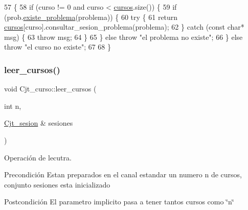 \begin{DoxyCode}
57                                                                                           \{
58   \textcolor{keywordflow}{if} (curso != 0 and curso < \mbox{\hyperlink{class_cjt__curso_af8d4def315cf56b9aab3328bf80bb32c}{cursos}}.size()) \{
59     \textcolor{keywordflow}{if} (prob.\mbox{\hyperlink{class_cjt__problema_a831be5b51e252520ee981b58d9ec00e9}{existe\_problema}}(problema)) \{
60       \textcolor{keywordflow}{try} \{
61        \textcolor{keywordflow}{return} \mbox{\hyperlink{class_cjt__curso_af8d4def315cf56b9aab3328bf80bb32c}{cursos}}[curso].consultar\_sesion\_problema(problema);
62      \} \textcolor{keywordflow}{catch} (\textcolor{keyword}{const} \textcolor{keywordtype}{char}* msg) \{
63          \textcolor{keywordflow}{throw} msg;
64      \}
65    \} \textcolor{keywordflow}{else} \textcolor{keywordflow}{throw} \textcolor{stringliteral}{"el problema no existe"};
66   \} \textcolor{keywordflow}{else} \textcolor{keywordflow}{throw} \textcolor{stringliteral}{"el curso no existe"};
67 
68 \}
\end{DoxyCode}
\mbox{\label{class_cjt__curso_a16e2b8c5304b5cb0562f95089f020a97}} 
\subsubsection{\texorpdfstring{leer\+\_\+cursos()}{leer\_cursos()}}
{\footnotesize\ttfamily void Cjt\+\_\+curso\+::leer\+\_\+cursos (\begin{DoxyParamCaption}\item[{int}]{n,  }\item[{\mbox{\hyperlink{class_cjt__sesion}{Cjt\+\_\+sesion}} \&}]{sesiones }\end{DoxyParamCaption})}



Operación de lecutra. 

\begin{DoxyPrecond}{Precondición}
Estan preparados en el canal estandar un numero n de cursos, conjunto sesiones esta inicializado 
\end{DoxyPrecond}
\begin{DoxyPostcond}{Postcondición}
El parametro implicito pasa a tener tantos cursos como \char`\"{}n\char`\"{} 
\end{DoxyPostcond}


